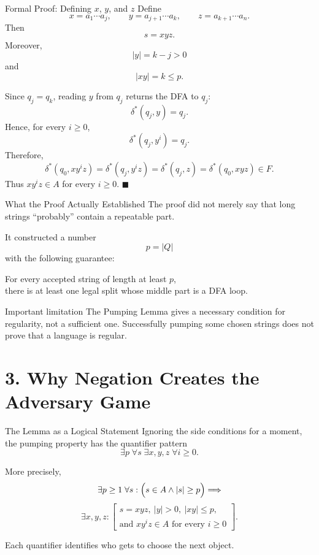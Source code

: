 \documentclass[10pt,aspectratio=169]{beamer}
\begin{document}
\begin{frame}{Formal Proof: Defining $x$, $y$, and $z$}
\footnotesize
Define
\[
x=a_1\cdots a_j,
\qquad
y=a_{j+1}\cdots a_k,
\qquad
z=a_{k+1}\cdots a_n.
\]
Then
\[
s=xyz.
\]
Moreover,
\[
|y|=k-j>0
\]
and
\[
|xy|=k\leq p.
\]

Since $q_j=q_k$, reading $y$ from $q_j$ returns the DFA to $q_j$:
\[
\delta^*(q_j,y)=q_j.
\]
Hence, for every $i\geq 0$,
\[
\delta^*(q_j,y^i)=q_j.
\]
Therefore,
\[
\delta^*(q_0,xy^iz)
=
\delta^*(q_j,y^iz)
=
\delta^*(q_j,z)
=
\delta^*(q_0,xyz)\in F.
\]
Thus $xy^iz\in A$ for every $i\geq 0$. \hfill $\blacksquare$
\end{frame}

\begin{frame}{What the Proof Actually Established}
The proof did not merely say that long strings ``probably'' contain a
repeatable part.

It constructed a number
\[
p=|Q|
\]
with the following guarantee:

\begin{center}
For every accepted string of length at least $p$,\\
there is at least one legal split whose middle part is a DFA loop.
\end{center}

\begin{alertblock}{Important limitation}
The Pumping Lemma gives a necessary condition for regularity, not a
sufficient one. Successfully pumping some chosen strings does not prove
that a language is regular.
\end{alertblock}
\end{frame}

\section{3. Why Negation Creates the Adversary Game}

\begin{frame}{The Lemma as a Logical Statement}
Ignoring the side conditions for a moment, the pumping property has the
quantifier pattern
\[
\exists p\;
\forall s\;
\exists x,y,z\;
\forall i\geq 0.
\]

More precisely,
\[
\exists p\geq 1\;\forall s:
\Bigl(s\in A\land |s|\geq p\Bigr)
\Longrightarrow
\]
\[
\exists x,y,z:
\left[
\begin{array}{c}
 s=xyz,\ |y|>0,\ |xy|\leq p,\\[0.2em]
 \text{and }xy^iz\in A\text{ for every }i\geq 0
\end{array}
\right].
\]

Each quantifier identifies who gets to choose the next object.
\end{frame}
\end{document}
